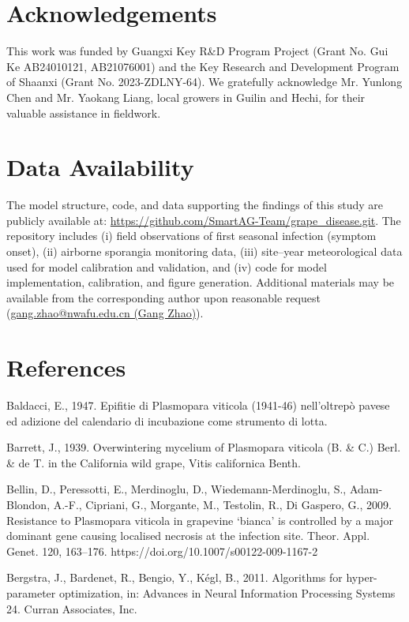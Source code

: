 \documentclass[
]{article}
\begin{document}
\section{Acknowledgements}\label{acknowledgements}

This work was funded by Guangxi Key R\&D Program Project (Grant No. Gui
Ke AB24010121, AB21076001) and the Key Research and Development Program
of Shaanxi (Grant No. 2023-ZDLNY-64). We gratefully acknowledge Mr. Yunlong Chen and Mr.
Yaokang Liang, local growers in Guilin and Hechi, for their valuable
assistance in fieldwork.

\section{Data Availability}\label{data-availability}

The model structure, code, and data supporting the findings of this
study are publicly available at:
\url{https://github.com/SmartAG-Team/grape_disease.git}. The repository
includes (i) field observations of first seasonal infection (symptom
onset), (ii) airborne sporangia monitoring data, (iii) site--year
meteorological data used for model calibration and validation, and (iv)
code for model implementation, calibration, and figure generation.
Additional materials may be available from the corresponding author upon
reasonable request (\ul{gang.zhao@nwafu.edu.cn (Gang Zhao)}).

\section{References}\label{references}

Baldacci, E., 1947. Epifitie di Plasmopara viticola (1941-46)
nell'oltrepò pavese ed adizione del calendario di incubazione come
strumento di lotta.

Barrett, J., 1939. Overwintering mycelium of Plasmopara viticola (B. \&
C.) Berl. \& de T. in the California wild grape, Vitis californica
Benth.

Bellin, D., Peressotti, E., Merdinoglu, D., Wiedemann-Merdinoglu, S.,
Adam-Blondon, A.-F., Cipriani, G., Morgante, M., Testolin, R., Di
Gaspero, G., 2009. Resistance to Plasmopara viticola in grapevine
`bianca' is controlled by a major dominant gene causing localised
necrosis at the infection site. Theor. Appl. Genet. 120, 163--176.
https://doi.org/10.1007/s00122-009-1167-2

Bergstra, J., Bardenet, R., Bengio, Y., Kégl, B., 2011. Algorithms for
hyper-parameter optimization, in: Advances in Neural Information
Processing Systems 24. Curran Associates, Inc.
\end{document}
